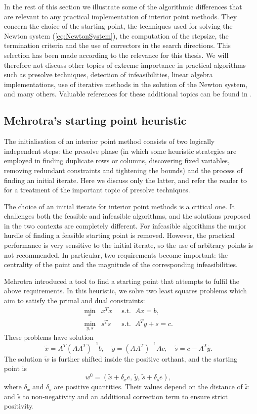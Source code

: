 In the rest of this section we illustrate some of 
the algorithmic differences that are relevant to any 
practical implementation of interior point methods.
They concern the choice of the starting point, the techniques
used for solving the Newton system (\ref{eq:NewtonSystem}), the computation
of the stepsize, the termination criteria and the use
of correctors in the search directions.
This selection has been made according to the relevance
for this thesis.
We will therefore not discuss other topics of extreme importance 
in practical algorithms such as presolve techniques, 
detection of infeasibilities, linear algebra implementations, 
use of iterative methods in the solution of the Newton system,
and many others.
Valuable references for these additional topics can be found in
\cite{AndersenGondzioMeszarosXu,GondzioTerlaky}.

%
%
\subsection{Mehrotra's starting point heuristic}
\label{sec:StartingPoint}

The initialisation of an interior point method consists of two
logically independent steps: the presolve phase (in which some
heuristic strategies are employed in finding duplicate rows or
columns, discovering fixed variables, removing redundant constraints 
and tightening the bounds)
and the process of finding an initial iterate.
Here we discuss only the latter, and refer the reader 
to \cite{AndersenAndersen}
for a treatment of the important topic of presolve techniques.

The choice of an initial iterate for interior point methods is a
critical one. It challenges both the feasible and infeasible
algorithms, and the solutions proposed in the two contexts are
completely different.
For infeasible algorithms the major hurdle
of finding a feasible starting point is removed. 
However, the practical performance is very sensitive to the initial
iterate, so the use of arbitrary points is not recommended.
In particular, two requirements become important: the centrality 
of the point and the magnitude of the corresponding infeasibilities.

Mehrotra \cite{Mehrotra92} introduced a tool to find a starting point 
that attempts to fulfil the above requirements. In this
heuristic, we solve two least squares problems which aim to
satisfy the primal and dual constraints:
\begin{eqnarray*}
  \min_x    \!\! & x^Tx & \;\;\mbox{s.t. }\; Ax = b,      \\
  \min_{y,s}\!\! & s^Ts & \;\;\mbox{s.t. }\; A^Ty + s = c.
\end{eqnarray*}
These problems have solution
\[
  \tilde x = A^T(AA^T)^{-1}b, \quad
  \tilde y = (AA^T)^{-1}Ac, \quad
  \tilde s = c - A^T \tilde y.
\]
The solution $\tilde w$ is further 
shifted inside the positive orthant, and the starting point is
\[
  w^0 = (\tilde x + \delta_x e,\, \tilde y,\, \tilde s + \delta_s e),
\]
where $\delta_x$ and $\delta_s$ are positive quantities. 
Their values depend on the distance of $\tilde x$ and $\tilde s$
to non-negativity and an additional correction term to ensure
strict positivity.


